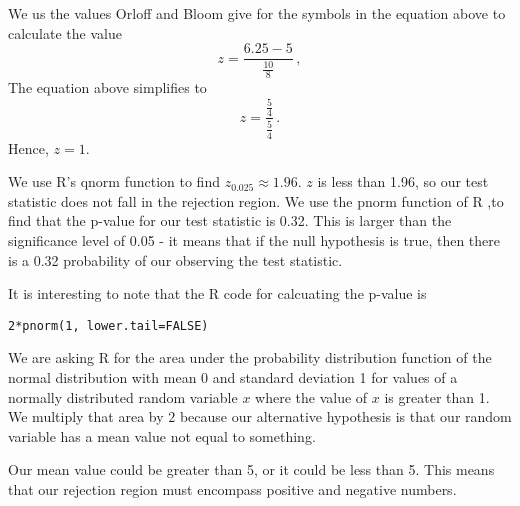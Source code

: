 \documentclass[a5paper,11pt]{article}
\begin{document}
We us the values Orloff and Bloom give for the symbols in the equation above 
to calculate the value
\begin{equation}
z=\frac{6.25 -5}{\frac{10}{8}}\,,
\end{equation} 
The equation above simplifies to 
\begin{equation}
z=\frac{\frac{5}{4}}{\frac{5}{4}}\,.
\end{equation}
Hence, $z=1$.

We use R's qnorm function to find $z_0.025 \approx 1.96$.  $z$ is less than
1.96, so our test statistic does not fall in the rejection region.  We use
the pnorm function of R \cite{rTut2Tail},to find that the p-value for our 
test statistic is 0.32.  This is larger than the significance level
of 0.05 - it means that if the null hypothesis is true, then there
is a 0.32 probability of our observing the test statistic.

It is interesting to note that the R code for calcuating the p-value is
\begin{lstlisting}
2*pnorm(1, lower.tail=FALSE)
\end{lstlisting}

We are asking R for the area under the probability distribution function
of the normal distribution with mean 0 and standard deviation 1 for values
of a normally distributed random variable $x$ where the value of $x$ is
greater than 1.  We multiply that area by $2$ because our alternative
hypothesis is that our random variable has a mean value not equal to something.

Our mean value could be greater than 5, or it could be less than 5.  This means that our rejection region must encompass positive and negative numbers.
\printbibliography{}
\end{document}

